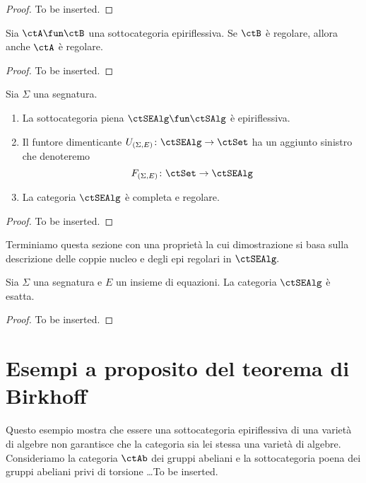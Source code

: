 \begin{proof}
To be inserted.
\end{proof}

\begin{lemma}\label{lemma_epirifl_reg}
Sia $\ctA \fun \ctB$ una sottocategoria epiriflessiva. Se $\ctB$ è regolare, allora anche $\ctA$ è regolare.
\end{lemma}

\begin{proof}
To be inserted.
\end{proof}

\begin{corollary}\label{cor_alg_reg}
Sia $\Sigma$ una segnatura. 
\begin{enumerate}
\item La sottocategoria piena $\ctSEAlg \fun \ctSAlg$ è epiriflessiva.
\item Il funtore dimenticante $U_{(\Sigma,E)} \colon \ctSEAlg \to \ctSet$ ha un aggiunto sinistro che denoteremo
$$F_{(\Sigma,E)} \colon \ctSet \to \ctSEAlg$$
\item La categoria $\ctSEAlg$ è completa e regolare.
\end{enumerate}
\end{corollary}

\begin{proof}
To be inserted.
\end{proof}

Terminiamo questa sezione con una proprietà la cui dimostrazione si basa sulla descrizione delle coppie nucleo e degli
epi regolari in $\ctSEAlg.$

\begin{proposition}\label{prop_alg_ex}
Sia $\Sigma$ una segnatura e $E$ un insieme di equazioni. La categoria $\ctSEAlg$ è esatta.
\end{proposition}

\begin{proof}
To be inserted.
\end{proof}

\section{Esempi a proposito del teorema di Birkhoff}\label{sec_ex_th_Birkhoff}

\begin{example}\label{esempio_torsionfree}
Questo esempio mostra che essere una sottocategoria epiriflessiva di una varietà di algebre non garantisce che la categoria 
sia lei stessa una varietà di algebre. Consideriamo la categoria $\ctAb$ dei gruppi abeliani e la sottocategoria poena dei gruppi 
abeliani privi di torsione \ldots To be inserted.
\end{example}

